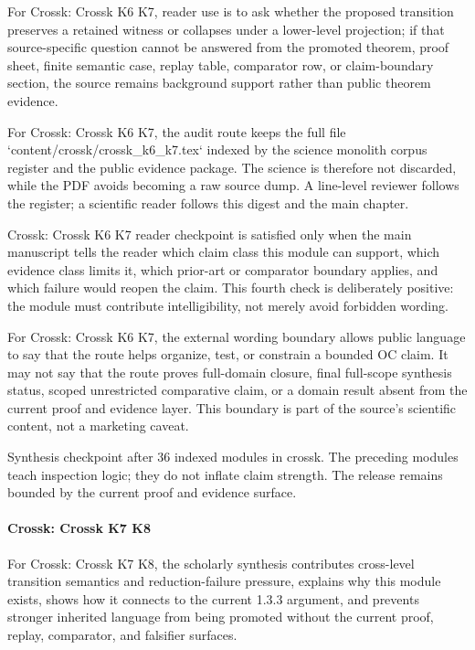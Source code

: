 For Crossk: Crossk K6 K7, reader use is to ask whether the proposed transition preserves a retained witness or collapses under a lower-level projection; if that source-specific question cannot be answered from the promoted theorem, proof sheet, finite semantic case, replay table, comparator row, or claim-boundary section, the source remains background support rather than public theorem evidence.


For Crossk: Crossk K6 K7, the audit route keeps the full file `content/crossk/crossk\_k6\_k7.tex` indexed by the science monolith corpus register and the public evidence package. The science is therefore not discarded, while the PDF avoids becoming a raw source dump. A line-level reviewer follows the register; a scientific reader follows this digest and the main chapter.


Crossk: Crossk K6 K7 reader checkpoint is satisfied only when the main manuscript tells the reader which claim class this module can support, which evidence class limits it, which prior-art or comparator boundary applies, and which failure would reopen the claim. This fourth check is deliberately positive: the module must contribute intelligibility, not merely avoid forbidden wording.


For Crossk: Crossk K6 K7, the external wording boundary allows public language to say that the route helps organize, test, or constrain a bounded OC claim. It may not say that the route proves full-domain closure, final full-scope synthesis status, scoped unrestricted comparative claim, or a domain result absent from the current proof and evidence layer. This boundary is part of the source's scientific content, not a marketing caveat.


Synthesis checkpoint after 36 indexed modules in crossk. The preceding modules teach inspection logic; they do not inflate claim strength. The release remains bounded by the current proof and evidence surface.


\paragraph{Crossk: Crossk K7 K8}

For Crossk: Crossk K7 K8, the scholarly synthesis contributes cross-level transition semantics and reduction-failure pressure, explains why this module exists, shows how it connects to the current 1.3.3 argument, and prevents stronger inherited language from being promoted without the current proof, replay, comparator, and falsifier surfaces.


